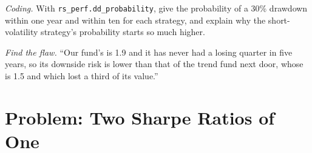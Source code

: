 \begin{exercise}[$\star\star\star$]\label{exo:rs:performance-measurement:7}
\emph{Coding.} With \texttt{rs\_perf.dd\_probability}, give the probability of a 30\% drawdown within one year and within ten for each strategy, and explain why
the short-volatility strategy's probability starts so much higher.
\end{exercise}

\begin{exercise}[$\star\star\star$]\label{exo:rs:performance-measurement:8}
\emph{Find the flaw.} ``Our fund's  is 1.9 and it has never had a losing quarter in five years, so its downside risk is lower than that of the
trend fund next door, whose  is 1.5 and which lost a third of its value.''
\end{exercise}

\section{Problem: Two Sharpe Ratios of One}

